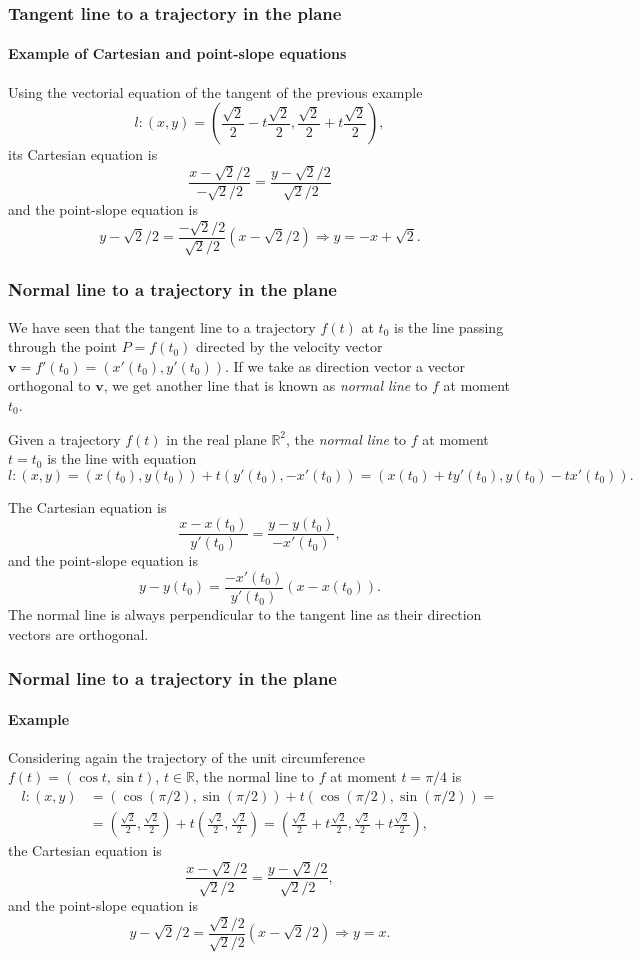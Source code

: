 \begin{frame}
\frametitle{Tangent line to a trajectory in the plane}
\framesubtitle{Example of Cartesian and point-slope equations}
Using the vectorial equation of the tangent of the previous example
\[
l: (x,y)=\left(\frac{\sqrt{2}}{2}-t\frac{\sqrt{2}}{2},\frac{\sqrt{2}}{2}+t\frac{\sqrt{2}}{2}\right),
\]
its Cartesian equation is 
\[
\frac{x-\sqrt{2}/2}{-\sqrt{2}/2} = \frac{y-\sqrt{2}/2}{\sqrt{2}/2}
\]
and the point-slope equation is 
\[
y-\sqrt{2}/2 = \frac{-\sqrt{2}/2}{\sqrt{2}/2}(x-\sqrt{2}/2) \Rightarrow y=-x+\sqrt{2}.
\]
\end{frame}


\begin{frame}
\frametitle{Normal line to a trajectory in the plane}
We have seen that the tangent line to a trajectory $f(t)$ at $t_0$ is the line passing through the point 
$P=f(t_0)$ directed by the velocity vector $\mathbf{v}=f'(t_0)=(x'(t_0),y'(t_0))$. 
If we take as direction vector a vector orthogonal to $\mathbf{v}$, we get another line that is known as \emph{normal line} to $f$ at moment $t_0$.
\begin{definition}
Given a trajectory $f(t)$ in the real plane $\mathbb{R}^2$, the \emph{normal line} to $f$ at moment $t=t_0$ is the line with equation
\[
l: (x,y)=(x(t_0),y(t_0))+t(y'(t_0),-x'(t_0)) = (x(t_0)+ty'(t_0),y(t_0)-tx'(t_0)).
\]
\end{definition}
The Cartesian equation is 
\[
\frac{x-x(t_0)}{y'(t_0)} = \frac{y-y(t_0)}{-x'(t_0)},
\]
and the point-slope equation is
\[
y-y(t_0) = \frac{-x'(t_0)}{y'(t_0)}(x-x(t_0)).
\]
The normal line is always perpendicular to the tangent line as their direction vectors are orthogonal. 
\end{frame}


\begin{frame}
\frametitle{Normal line to a trajectory in the plane}
\framesubtitle{Example}
Considering again the trajectory of the unit circumference $f(t) = (\cos t,\sin t)$, $t\in \mathbb{R}$, the normal line to $f$ at moment $t=\pi/4$ is
\begin{align*}
l: (x,y)&=(\cos(\pi/2),\sin(\pi/2))+t(\cos(\pi/2),\sin(\pi/2)) =\\
&= \left(\frac{\sqrt{2}}{2},\frac{\sqrt{2}}{2}\right)+t\left(\frac{\sqrt{2}}{2},\frac{\sqrt{2}}{2}\right)
=\left(\frac{\sqrt{2}}{2}+t\frac{\sqrt{2}}{2},\frac{\sqrt{2}}{2}+t\frac{\sqrt{2}}{2}\right),
\end{align*}
the Cartesian equation is 
\[
\frac{x-\sqrt{2}/2}{\sqrt{2}/2} = \frac{y-\sqrt{2}/2}{\sqrt{2}/2},
\]
and the point-slope equation is 
\[
y-\sqrt{2}/2 = \frac{\sqrt{2}/2}{\sqrt{2}/2}(x-\sqrt{2}/2) \Rightarrow y=x.
\]
\end{frame}


